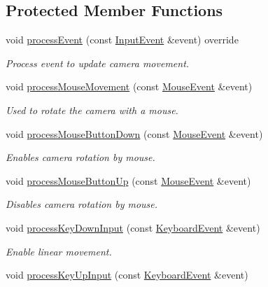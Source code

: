 \subsection*{Protected Member Functions}
\begin{DoxyCompactItemize}
\item 
void \mbox{\hyperlink{classec_1_1_camera_controller_af44aad5f80005eaadf5d637b3b00c6d6}{process\+Event}} (const \mbox{\hyperlink{structec_1_1_input_event}{Input\+Event}} \&event) override
\begin{DoxyCompactList}\small\item\em Process event to update camera movement. \end{DoxyCompactList}\item 
void \mbox{\hyperlink{classec_1_1_camera_controller_a9dc1490128a5946521a4111938564b42}{process\+Mouse\+Movement}} (const \mbox{\hyperlink{structec_1_1_mouse_event}{Mouse\+Event}} \&event)
\begin{DoxyCompactList}\small\item\em Used to rotate the camera with a mouse. \end{DoxyCompactList}\item 
void \mbox{\hyperlink{classec_1_1_camera_controller_ac2d7bd60346a2f23f591b9b5c05550dc}{process\+Mouse\+Button\+Down}} (const \mbox{\hyperlink{structec_1_1_mouse_event}{Mouse\+Event}} \&event)
\begin{DoxyCompactList}\small\item\em Enables camera rotation by mouse. \end{DoxyCompactList}\item 
void \mbox{\hyperlink{classec_1_1_camera_controller_af2a0f763157a655d53538ac9644620dd}{process\+Mouse\+Button\+Up}} (const \mbox{\hyperlink{structec_1_1_mouse_event}{Mouse\+Event}} \&event)
\begin{DoxyCompactList}\small\item\em Disables camera rotation by mouse. \end{DoxyCompactList}\item 
void \mbox{\hyperlink{classec_1_1_camera_controller_af1e6f226b4af2aa815bd885f71d25c12}{process\+Key\+Down\+Input}} (const \mbox{\hyperlink{structec_1_1_keyboard_event}{Keyboard\+Event}} \&event)
\begin{DoxyCompactList}\small\item\em Enable linear movement. \end{DoxyCompactList}\item 
void \mbox{\hyperlink{classec_1_1_camera_controller_ac92bb03a95ddf600b4a08b5b043b601e}{process\+Key\+Up\+Input}} (const \mbox{\hyperlink{structec_1_1_keyboard_event}{Keyboard\+Event}} \&event)

\end{DoxyCompactItemize}
